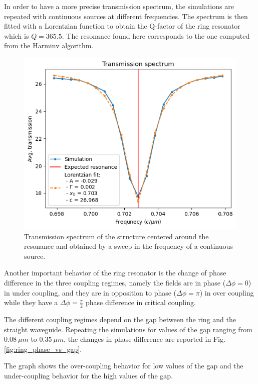 In order to have a more precise transmission spectrum, the simulations are repeated with continuous sources at different frequencies. The spectrum is then fitted with a Lorentzian function to obtain the Q-factor of the ring resonator which is \(Q=365.5\). The resonance found here corresponds to the one computed from the Harminv algorithm.

\begin{figure}[H]
    \centering
    \includegraphics[width=0.7\linewidth]{Figures/ring_frequency_sweep.png}
    \caption{Transmission spectrum of the structure centered around the resonance and obtained by a sweep in the frequency of a continuous source.}
    \label{fig:ring_frequency_sweep}
\end{figure}

Another important behavior of the ring resonator is the change of phase difference in the three coupling regimes, namely the fields are in phase (\(\Delta \phi = 0\)) in under coupling, and they are in opposition to phase (\(\Delta \phi = \pi\)) in over coupling while they have a \(\Delta \phi = \frac{\pi}{2}\) phase difference in critical coupling.

The different coupling regimes depend on the gap between the ring and the straight waveguide. Repeating the simulations for values of the gap ranging from \(0.08\ \mu m\) to \(0.35\ \mu m\), the changes in phase difference are reported in Fig.\ref{fig:ring_phase_vs_gap}. 

The graph shows the over-coupling behavior for low values of the gap and the under-coupling behavior for the high values of the gap.

